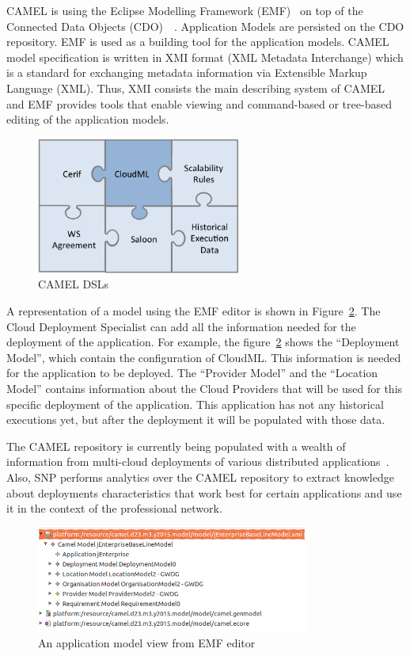 CAMEL is using the Eclipse Modelling Framework (EMF)~\cite{steinberg2008emf} on top of the Connected Data Objects (CDO)~\cite{cdomodel}~\cite{paasage-d4.1.1}. Application Models are persisted on the CDO repository. EMF is used as a building tool for the application models. CAMEL model specification is written in XMI format (XML Metadata Interchange) which is a standard for exchanging metadata information via Extensible Markup Language (XML). Thus, XMI consists the main describing system of CAMEL and EMF provides tools that enable viewing and command-based or tree-based editing of the application models. 

\begin{figure}[h]
	\centering
	\includegraphics[width=0.6\textwidth,natwidth=200,natheight=150]{./fig/dsl.png}
	\caption{CAMEL DSLs}
	\label{fig:dsls}
\end{figure}

A representation of a model using the EMF editor is shown in Figure~\ref{fig:app_view_emf}. The Cloud Deployment Specialist can add all the information needed for the deployment of the application. For example, the figure~\ref{fig:app_view_emf} shows the ``Deployment Model'', which contain the configuration of CloudML. This information is needed for the application to be deployed. The ``Provider Model'' and the ``Location Model'' contains information about the Cloud Providers that will be used for this specific deployment of the application. This application has not any historical executions yet, but after the deployment it will be populated with those data.
 
The CAMEL repository is currently being populated with a wealth of information from multi-cloud deployments of various distributed applications~\cite{Papaioannou2013}. Also, SNP performs analytics over the CAMEL repository to extract knowledge about deployments characteristics that work best for certain applications and use it in the context of the professional network.

\begin{figure}[h]
	\centering
	\includegraphics[width=0.8\textwidth,natwidth=200,natheight=150]{./fig/camel_model_example.png}
	\caption{An application model view from EMF editor}
	\label{fig:app_view_emf}
\end{figure}

